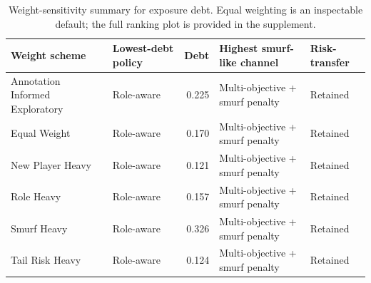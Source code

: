 \begin{table}[t]
\centering
\caption{Weight-sensitivity summary for exposure debt. Equal weighting is an inspectable default; the full ranking plot is provided in the supplement.}
\label{tab:weight-sensitivity-summary}
\small
\begin{tabularx}{\textwidth}{p{} p{} r p{} X}
\toprule
Weight scheme & Lowest-debt policy & Debt & Highest smurf-like channel & Risk-transfer \\
\midrule
Annotation Informed Exploratory & Role-aware & 0.225 & Multi-objective + smurf penalty & Retained \\
Equal Weight & Role-aware & 0.170 & Multi-objective + smurf penalty & Retained \\
New Player Heavy & Role-aware & 0.121 & Multi-objective + smurf penalty & Retained \\
Role Heavy & Role-aware & 0.157 & Multi-objective + smurf penalty & Retained \\
Smurf Heavy & Role-aware & 0.326 & Multi-objective + smurf penalty & Retained \\
Tail Risk Heavy & Role-aware & 0.124 & Multi-objective + smurf penalty & Retained \\
\bottomrule
\end{tabularx}
\end{table}
